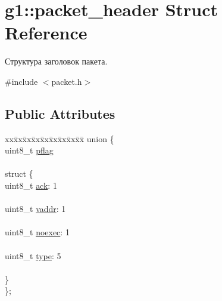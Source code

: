 \hypertarget{structg1_1_1packet__header}{}\section{g1\+:\+:packet\+\_\+header Struct Reference}
\label{structg1_1_1packet__header}


Структура заголовок пакета.  




{\ttfamily \#include $<$packet.\+h$>$}

\subsection*{Public Attributes}
\begin{DoxyCompactItemize}
\item 
\begin{tabbing}
xx\=xx\=xx\=xx\=xx\=xx\=xx\=xx\=xx\=\kill
union \{\\
\>uint8\_t \hyperlink{structg1_1_1packet__header_a77b86061c82d26733d902eb73af5976c}{pflag}\\
\>\\
\>struct \{\\
\>\>uint8\_t \hyperlink{structg1_1_1packet__header_aca195e6bf8702ea26416b4a472c57ece}{ack}: 1\\
\>\>\\
\>\>uint8\_t \hyperlink{structg1_1_1packet__header_af77da0c7bd8984cd085ef435241be26d}{vaddr}: 1\\
\>\>\\
\>\>uint8\_t \hyperlink{structg1_1_1packet__header_aabd2a184ff74a6e00efeaa29ff77f8c6}{noexec}: 1\\
\>\>\\
\>\>uint8\_t \hyperlink{structg1_1_1packet__header_a22b4c753541bb0a873f193c4c40cbd5b}{type}: 5\\
\>\>\\
\>\} \hypertarget{uniong1_1_1packet__header_1_1_0D0_a4a3039864fea2668bb6bc713d929cd2a}{}\label{uniong1_1_1packet__header_1_1_0D0_a4a3039864fea2668bb6bc713d929cd2a}
\\
\}; \hypertarget{structg1_1_1packet__header_a51a68c60941af526631dac75cf46878f}{}\label{structg1_1_1packet__header_a51a68c60941af526631dac75cf46878f}
\\


\end{tabbing}
\end{DoxyCompactItemize}
